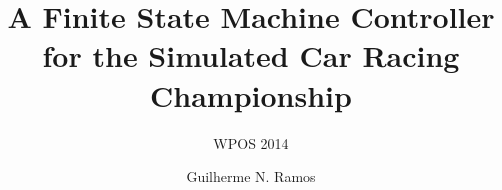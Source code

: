 \documentclass{UnBeamer}%
\title{A Finite State Machine Controller for the Simulated Car Racing Championship}%
\subtitle{WPOS 2014}%
\author[gnramos]{Guilherme N. Ramos}%
\institute[CIC]{Departamento de Ciência da Computação\\Universidade de Brasília}%
\date[2014/1]{}%
\begin{document}
%
	\frame{\maketitle}%
\end{document}
